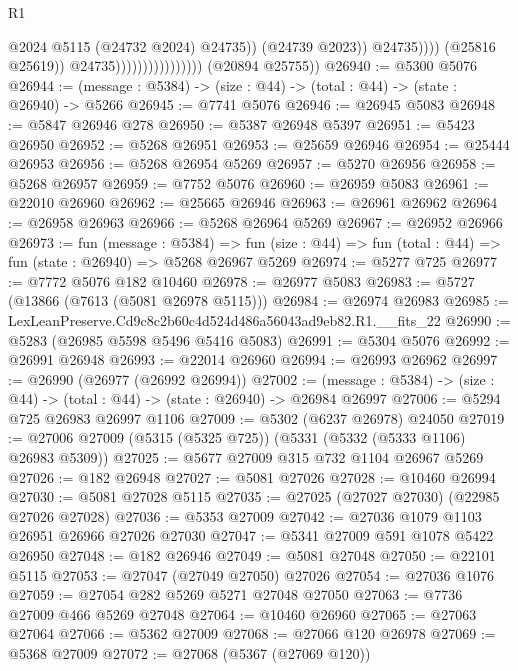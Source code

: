 \begin{lexlean}{R1}
\begin{coremodule}
                                                      @2024
                                                      @5115
                                                      (@24732 @2024)
                                                      @24735))
                                                  (@24739 @2023))
                                                @24735))))
                                        (@25816 @25619))
                                      @24735))))))))))))))))
      (@20894 @25755))
@26940 := @5300 @5076
@26944 := (message : @5384) -> (size : @44) -> (total : @44) -> (state : @26940) -> @5266
@26945 := @7741 @5076
@26946 := @26945 @5083
@26948 := @5847 @26946 @278
@26950 := @5387 @26948 @5397
@26951 := @5423 @26950
@26952 := @5268 @26951
@26953 := @25659 @26946
@26954 := @25444 @26953
@26956 := @5268 @26954 @5269
@26957 := @5270 @26956
@26958 := @5268 @26957
@26959 := @7752 @5076
@26960 := @26959 @5083
@26961 := @22010 @26960
@26962 := @25665 @26946
@26963 := @26961 @26962
@26964 := @26958 @26963
@26966 := @5268 @26964 @5269
@26967 := @26952 @26966
@26973 := fun (message : @5384) =>
  fun (size : @44) => fun (total : @44) => fun (state : @26940) => @5268 @26967 @5269
@26974 := @5277 @725
@26977 := @7772 @5076 @182 @10460
@26978 := @26977 @5083
@26983 := @5727 (@13866 (@7613 (@5081 @26978 @5115)))
@26984 := @26974 @26983
@26985 := LexLeanPreserve.Cd9c8c2b60c4d524d486a56043ad9eb82.R1.__fits_22
@26990 := @5283 (@26985 @5598 @5496 @5416 @5083)
@26991 := @5304 @5076
@26992 := @26991 @26948
@26993 := @22014 @26960
@26994 := @26993 @26962
@26997 := @26990 (@26977 (@26992 @26994))
@27002 := (message : @5384) -> (size : @44) -> (total : @44) -> (state : @26940) -> @26984 @26997
@27006 := @5294 @725 @26983 @26997 @1106
@27009 := @5302 (@6237 @26978) @24050
@27019 := @27006 @27009 (@5315 (@5325 @725)) (@5331 (@5332 (@5333 @1106) @26983 @5309))
@27025 := @5677 @27009 @315 @732 @1104 @26967 @5269
@27026 := @182 @26948
@27027 := @5081 @27026
@27028 := @10460 @26994
@27030 := @5081 @27028 @5115
@27035 := @27025 (@27027 @27030) (@22985 @27026 @27028)
@27036 := @5353 @27009
@27042 := @27036 @1079 @1103 @26951 @26966 @27026 @27030
@27047 := @5341 @27009 @591 @1078 @5422 @26950
@27048 := @182 @26946
@27049 := @5081 @27048
@27050 := @22101 @5115
@27053 := @27047 (@27049 @27050) @27026
@27054 := @27036 @1076
@27059 := @27054 @282 @5269 @5271 @27048 @27050
@27063 := @7736 @27009 @466 @5269 @27048
@27064 := @10460 @26960
@27065 := @27063 @27064
@27066 := @5362 @27009
@27068 := @27066 @120 @26978
@27069 := @5368 @27009
@27072 := @27068 (@5367 (@27069 @120))

\end{coremodule}
\end{lexlean}
